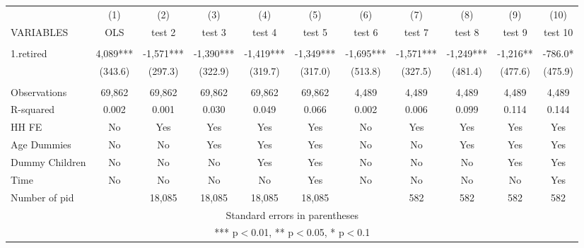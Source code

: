 \begin{tabular}{lcccccccccc} \hline
 & (1) & (2) & (3) & (4) & (5) & (6) & (7) & (8) & (9) & (10) \\
VARIABLES & OLS & test 2 & test 3 & test 4 & test 5 & test 6 & test 7 & test 8 & test 9 & test 10 \\ \hline
 &  &  &  &  &  &  &  &  &  &  \\
1.retired & 4,089*** & -1,571*** & -1,390*** & -1,419*** & -1,349*** & -1,695*** & -1,571*** & -1,249*** & -1,216** & -786.0* \\
 & (343.6) & (297.3) & (322.9) & (319.7) & (317.0) & (513.8) & (327.5) & (481.4) & (477.6) & (475.9) \\
 &  &  &  &  &  &  &  &  &  &  \\
Observations & 69,862 & 69,862 & 69,862 & 69,862 & 69,862 & 4,489 & 4,489 & 4,489 & 4,489 & 4,489 \\
R-squared & 0.002 & 0.001 & 0.030 & 0.049 & 0.066 & 0.002 & 0.006 & 0.099 & 0.114 & 0.144 \\
HH FE & No & Yes & Yes & Yes & Yes & No & Yes & Yes & Yes & Yes \\
Age Dummies & No & No & Yes & Yes & Yes & No & No & Yes & Yes & Yes \\
Dummy Children & No & No & No & Yes & Yes & No & No & No & Yes & Yes \\
Time & No & No & No & No & Yes & No & No & No & No & Yes \\
 Number of pid &  & 18,085 & 18,085 & 18,085 & 18,085 &  & 582 & 582 & 582 & 582 \\ \hline
\multicolumn{11}{c}{ Standard errors in parentheses} \\
\multicolumn{11}{c}{ *** p$<$0.01, ** p$<$0.05, * p$<$0.1} \\
\end{tabular}
